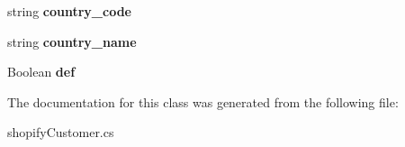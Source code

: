 \begin{DoxyCompactItemize}
\mbox{\label{class_nexus_1_1shopify_customer_1_1_address_a0e5c0eaf6d2c421abc1a453562f5b0d6}} 
string {\bfseries country\+\_\+code}
\item 
\mbox{\label{class_nexus_1_1shopify_customer_1_1_address_aae57cd032c1193327d9030fb00e22df4}} 
string {\bfseries country\+\_\+name}
\item 
\mbox{\label{class_nexus_1_1shopify_customer_1_1_address_a94eb0028be05e42018fd6b5ce0721de9}} 
Boolean {\bfseries def}
\end{DoxyCompactItemize}


The documentation for this class was generated from the following file\+:\begin{DoxyCompactItemize}
\item 
shopify\+Customer.\+cs\end{DoxyCompactItemize}
